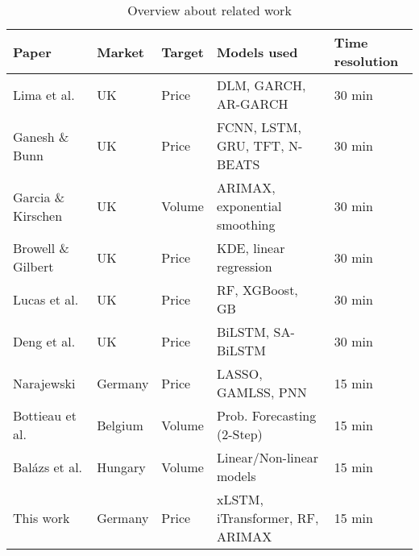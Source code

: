 \documentclass[class=scrbook, crop=false]{standalone}
\begin{document}
\begin{table}

    \centering
\begin{tabular}{l|l|l|l|l}
Paper & Market & Target & Models used & Time resolution  \\\hline
Lima et al.  \cite{limaBayesianPredictiveDistributions2023}	&UK	&Price	&DLM, GARCH, AR-GARCH	&30 min	 \\
Ganesh \& Bunn  \cite{ganeshForecastingImbalancePrice2024}	 &UK&Price	&FCNN, LSTM, GRU, TFT, N-BEATS&	30 min	 \\
Garcia \& Kirschen  \cite{garciaForecastingSystemImbalance2006}	&UK	&Volume&	\gls{ARIMAX}, exponential smoothing&	30 min	 \\
Browell \& Gilbert \cite{browellPredictingElectricityImbalance2022}&	UK&	Price	&KDE, linear regression	&30 min	 \\
Lucas et al.  \cite{lucasPriceForecastingBalancing2020}&UK&	Price	&RF, XGBoost, GB	&30 min	 \\
Deng et al.  \cite{dengSeasonalityDeepLearning2024}	&UK	& Price	&BiLSTM, SA-BiLSTM&	30 min \\
Narajewski \cite{narajewskiProbabilisticForecastingGerman2022}&Germany&	Price	&LASSO, GAMLSS, PNN	&15 min	 \\
Bottieau et al.  \cite{bottieauVeryShortTermProbabilisticForecasting2020}&	Belgium	&Volume&Prob. Forecasting (2-Step)	&15 min	\\
Balázs et al. \cite{balazsShorttermSystemImbalance2024}	&Hungary&	Volume	&Linear/Non-linear models&	15 min \\
This work	&Germany&	 Price&	xLSTM, iTransformer, RF, ARIMAX	&15 min\\
\end{tabular}
\caption{Overview about related work}
\label{Table::Related_Work}
\end{table}



\end{document}
